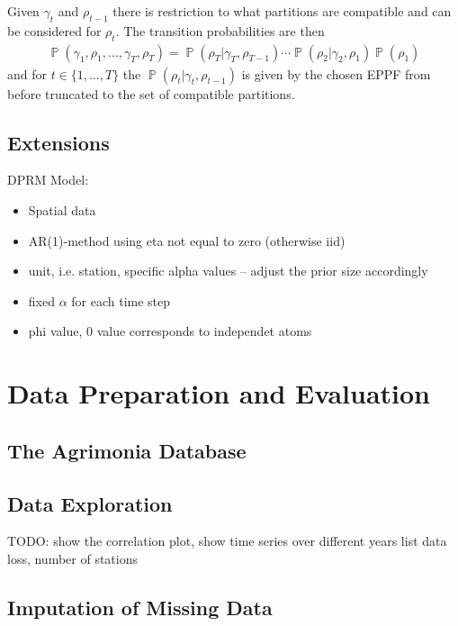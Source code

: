 \documentclass[12pt,a4paper]{article}
\DeclareMathOperator{\PP}{\mathbb{P}}
\begin{document}
Given $\gamma_t$ and $\rho_{t-1}$ there is restriction to what partitions are compatible and can be considered for $\rho_{t}$. The transition probabilities are then
\begin{align*}
    \PP(\gamma_1, \rho_1, \ldots, \gamma_T, \rho_T) = \PP(\rho_T\vert \gamma_T, \rho_{T-1})  \cdots  \PP(\rho_2\vert \gamma_2, \rho_{1}) \PP(\rho_1)
\end{align*}
and for $t \in \{1, \dots, T \}$ the $\PP(\rho_t\vert \gamma_t, \rho_{t-1})$ is given by the chosen EPPF from before truncated to the set of compatible partitions.

\subsection{Extensions}
\label{subsec:DRPMExtensions}

DPRM Model:
\begin{itemize}
    \item Spatial data
    \item AR(1)-method using eta not equal to zero (otherwise iid)
    \item unit, i.e. station, specific alpha values -- adjust the prior size accordingly
    \item fixed $\alpha$ for each time step
    \item phi value, 0 value corresponds to independet atoms
\end{itemize}
\section{Data Preparation and Evaluation}


\subsection{The Agrimonia Database}

\subsection{Data Exploration}
TODO: show the correlation plot, show time series over different years
list data loss, number of stations

\subsection{Imputation of Missing Data}
\end{document}
